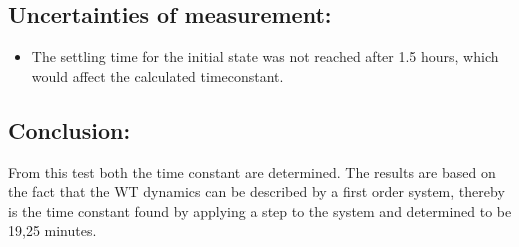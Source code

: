 
\subsection*{Uncertainties of measurement:}
\begin{itemize}
\item The settling time for the initial state was not reached after 1.5 hours, which would affect the calculated timeconstant.
\end{itemize}

\subsection*{Conclusion:}
From this test both the time constant are determined. The results are based on the fact that the WT dynamics can be described by a first order system, thereby is the time constant found by applying a step to the system and determined to be 19,25 minutes. 